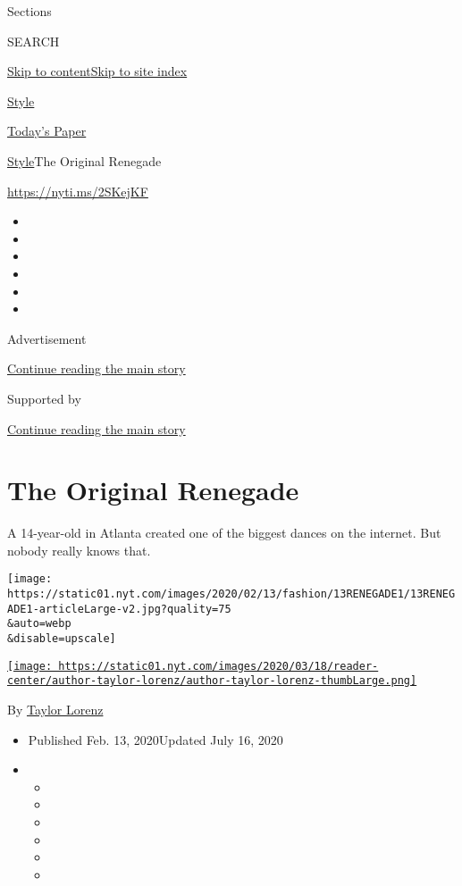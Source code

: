 Sections

SEARCH

\protect\hyperlink{site-content}{Skip to
content}\protect\hyperlink{site-index}{Skip to site index}

\href{https://www.nytimes.com/section/style}{Style}

\href{https://myaccount.nytimes.com/auth/login?response_type=cookie\&client_id=vi}{}

\href{https://www.nytimes.com/section/todayspaper}{Today's Paper}

\href{/section/style}{Style}\textbar{}The Original Renegade

\url{https://nyti.ms/2SKejKF}

\begin{itemize}
\item
\item
\item
\item
\item
\item
\end{itemize}

Advertisement

\protect\hyperlink{after-top}{Continue reading the main story}

Supported by

\protect\hyperlink{after-sponsor}{Continue reading the main story}

\hypertarget{the-original-renegade}{%
\section{The Original Renegade}\label{the-original-renegade}}

A 14-year-old in Atlanta created one of the biggest dances on the
internet. But nobody really knows that.

\texttt{[image: https://static01.nyt.com/images/2020/02/13/fashion/13RENEGADE1/13RENEGADE1-articleLarge-v2.jpg?quality=75\\\&auto=webp\\\&disable=upscale]}

\href{https://www.nytimes.com/by/taylor-lorenz}{\texttt{[image: https://static01.nyt.com/images/2020/03/18/reader-center/author-taylor-lorenz/author-taylor-lorenz-thumbLarge.png]}}

By \href{https://www.nytimes.com/by/taylor-lorenz}{Taylor Lorenz}

\begin{itemize}
\item
  Published Feb. 13, 2020Updated July 16, 2020
\item
  \begin{itemize}
  \item
  \item
  \item
  \item
  \item
  \item
  \end{itemize}
\end{itemize}

